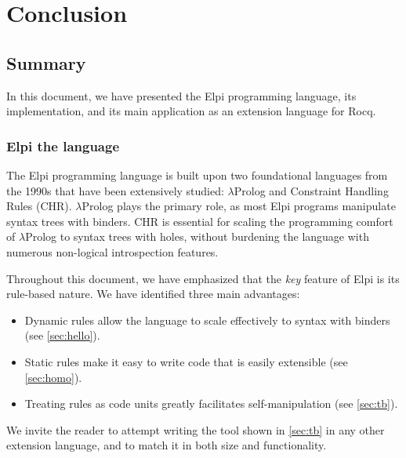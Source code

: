 \documentclass[a4paper, 11pt]{book}
\begin{document}
\chapter{Conclusion}

\section{Summary}


In this document, we have presented the Elpi programming language, its
implementation, and its main application as an extension language for Rocq.

\subsection{Elpi the language}

The Elpi programming language is built upon two foundational languages from the
1990s that have been extensively studied: $\lambda$Prolog and Constraint
Handling Rules (CHR). $\lambda$Prolog plays the primary role, as most Elpi
programs manipulate syntax trees with binders. CHR is essential for scaling the
programming comfort of $\lambda$Prolog to syntax trees with holes, without
burdening the language with numerous non-logical introspection features.

Throughout this document, we have emphasized that the \emph{key} feature of Elpi
is its rule-based nature. We have identified three main advantages:
\begin{itemize}
\item Dynamic rules allow the language to scale effectively to syntax with binders (see \cref{sec:hello}).
\item Static rules make it easy to write code that is easily extensible (see \cref{sec:homo}).
\item Treating rules as code units greatly facilitates self-manipulation (see \cref{sec:tb}).
\end{itemize}

We invite the reader to attempt writing the  tool shown in
\cref{sec:tb} in any other extension language, and to match it in both
size and functionality.
\end{document}
